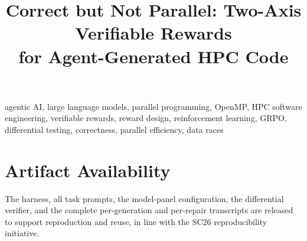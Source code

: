 \documentclass[conference]{IEEEtran}
\begin{document}
\title{Correct but Not Parallel: Two-Axis Verifiable Rewards\\
for Agent-Generated HPC Code}

\author{
}


\maketitle



\begin{IEEEkeywords}
agentic AI, large language models, parallel programming, OpenMP, HPC software
engineering, verifiable rewards, reward design, reinforcement learning, GRPO,
differential testing, correctness, parallel efficiency, data races
\end{IEEEkeywords}










\section*{Artifact Availability}
The harness, all task prompts, the model-panel configuration, the differential
verifier, and the complete per-generation and per-repair transcripts are released
to support reproduction and reuse, in line with the SC26 reproducibility
initiative.



\end{document}
